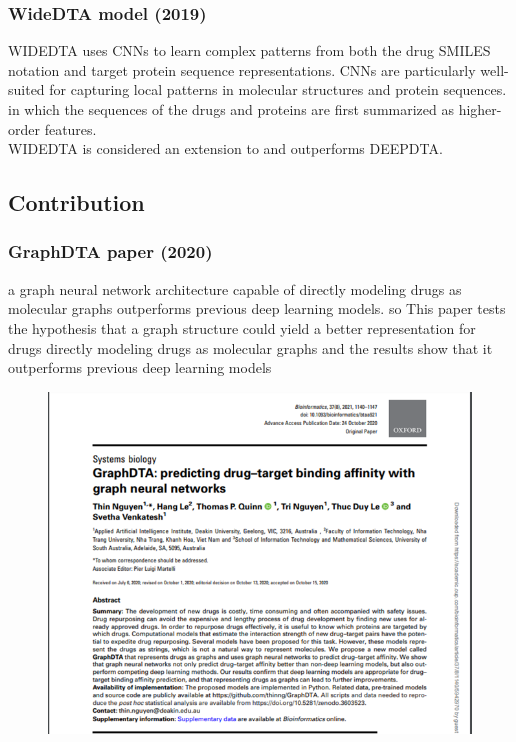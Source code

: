 \documentclass[11pt, a4paper]{article}
\begin{document}
            \subsubsection{WideDTA model (2019) \cite{10}}
                WIDEDTA uses CNNs to learn complex patterns from both the drug SMILES notation and target protein sequence representations. CNNs are particularly well-suited for capturing local patterns in molecular structures and protein sequences.
                in which the sequences of the drugs and proteins are first summarized as higher-order features.\\
                WIDEDTA is considered an extension to and outperforms DEEPDTA. 
    
    
        \subsection{Contribution}
            \subsubsection{GraphDTA paper (2020)}
            a graph neural network architecture capable of directly modeling drugs as molecular graphs outperforms previous deep learning models.
            so This paper tests the hypothesis that a graph structure could yield a better representation for drugs
            directly modeling drugs as molecular graphs and the results show that it outperforms previous deep learning models
 
            \begin{figure}[H]
                \centering
                \begin{minipage}{0.45\textwidth}
                \includegraphics[width=\textwidth]{DTA overview.png}
                \end{minipage}   
            \end{figure}
            
\end{document}
